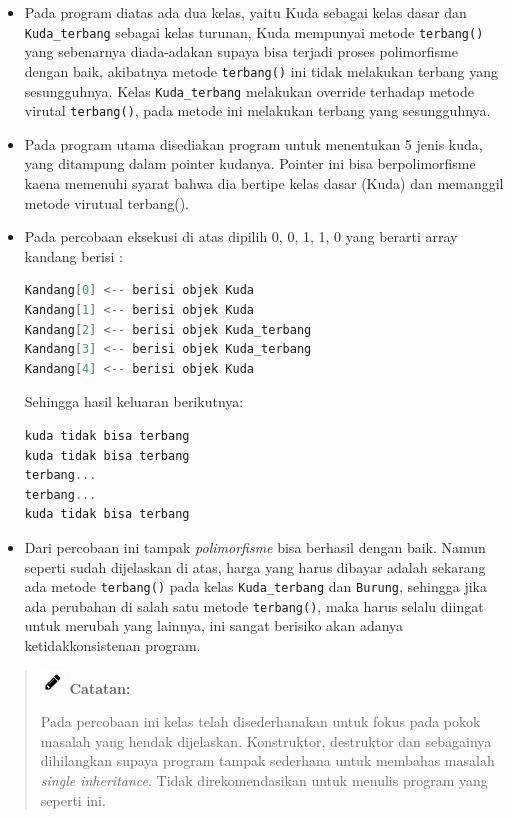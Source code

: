 \begin{itemize}
\item
  Pada program diatas ada dua kelas, yaitu Kuda sebagai kelas dasar dan
  \texttt{Kuda\_terbang} sebagai kelas turunan, Kuda mempunyai metode
  \texttt{terbang()} yang sebenarnya diada-adakan supaya bisa terjadi
  proses polimorfisme dengan baik, akibatnya metode \texttt{terbang()}
  ini tidak melakukan terbang yang sesungguhnya. Kelas
  \texttt{Kuda\_terbang} melakukan override terhadap metode virutal
  \texttt{terbang()}, pada metode ini melakukan terbang yang
  sesungguhnya.
\item
  Pada program utama disediakan program untuk menentukan 5 jenis kuda,
  yang ditampung dalam pointer kudanya. Pointer ini bisa berpolimorfisme
  kaena memenuhi syarat bahwa dia bertipe kelas dasar (Kuda) dan
  memanggil metode virutual terbang().
\item
  Pada percobaan eksekusi di atas dipilih 0, 0, 1, 1, 0 yang berarti
  array kandang berisi :

\begin{lstlisting}[language=c++, numbers=none]
Kandang[0] <-- berisi objek Kuda 
Kandang[1] <-- berisi objek Kuda 
Kandang[2] <-- berisi objek Kuda_terbang 
Kandang[3] <-- berisi objek Kuda_terbang 
Kandang[4] <-- berisi objek Kuda 
\end{lstlisting}

  Sehingga hasil keluaran berikutnya:

\begin{lstlisting}[language=c++, numbers=none]
kuda tidak bisa terbang 
kuda tidak bisa terbang 
terbang... 
terbang... 
kuda tidak bisa terbang
\end{lstlisting}
\item
  Dari percobaan ini tampak \emph{polimorfisme} bisa berhasil dengan
  baik. Namun seperti sudah dijelaskan di atas, harga yang harus dibayar
  adalah sekarang ada metode \texttt{terbang()} pada kelas
  \texttt{Kuda\_terbang} dan \texttt{Burung}, sehingga jika ada
  perubahan di salah satu metode \texttt{terbang()}, maka harus selalu
  diingat untuk merubah yang lainnya, ini sangat berisiko akan adanya
  ketidakkonsistenan program.
\end{itemize}
\begin{quotation}
\includegraphics{../manuscript/images/pencil}	\textbf{Catatan:}
	
	Pada
	percobaan ini kelas telah disederhanakan untuk fokus pada pokok masalah
	yang hendak dijelaskan. Konstruktor, destruktor dan sebagainya
	dihilangkan supaya program tampak sederhana untuk membahas masalah
	\emph{single inheritance}. Tidak direkomendasikan untuk menulis program
	yang seperti ini.
\end{quotation}



